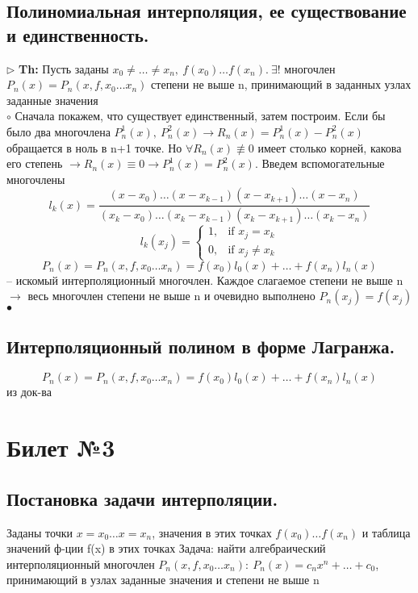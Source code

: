 \documentclass[a4paper]{article}
\begin{document}
\subsection{Полиномиальная интерполяция, ее существование и единственность.}
$\triangleright$ \textbf{Th:} Пусть заданы $x_0 \neq \ldots \neq x_n,\ f(x_0) \ldots f(x_n). \ \exists !$ многочлен $P_n(x) = P_n(x,f,x_0 \ldots x_n)$ степени не выше n, принимающий в заданных узлах заданные значения \\
	$\circ$ Сначала покажем, что существует единственный, затем построим.
	Если бы было два многочлена $P_n^1(x),\ P_n^2(x) \rightarrow R_n(x) = P_n^1(x)-P_n^2(x)$ обращается в ноль в n+1 точке. Но $\forall R_n(x) \not\equiv 0$ имеет столько корней, какова его степень $\rightarrow R_n(x) \equiv 0 \rightarrow P_n^1(x)=P_n^2(x)$.
	Введем вспомогательные многочлены $$l_k(x) = \frac{(x-x_0) \ldots (x-x_{k-1})(x-x_{k+1}) \ldots (x-x_n)}{(x_k-x_0) \ldots (x_k-x_{k-1})(x_k-x_{k+1}) \ldots (x_k-x_n)}$$ 
	$$l_k(x_j)=\begin{cases} 1,  & \mbox{if }x_j = x_k\\ 0, & \mbox{if }x_j \neq x_k \end{cases}$$
	$$P_n(x) = P_n(x,f,x_0 \ldots x_n) = f(x_0)l_0(x) + \ldots + f(x_n)l_n(x)$$ – искомый интерполяционный многочлен. Каждое слагаемое степени не выше n $\rightarrow$ весь многочлен степени не выше n и очевидно выполнено $P_n(x_j)=f(x_j)$
	$\bullet$
\subsection{Интерполяционный полином в форме Лагранжа.}
	$$P_n(x) = P_n(x,f,x_0 \ldots x_n) = f(x_0)l_0(x) + \ldots + f(x_n)l_n(x)$$ из док-ва

\section{Билет №3}
\subsection{Постановка задачи интерполяции.}
Заданы точки $x=x_0 \ldots x=x_n$, значения в этих точках $f(x_0) \ldots f(x_n)$ и таблица значений ф-ции f(x) в этих точках
Задача: найти алгебраический интерполяционный многочлен $P_n(x,f,x_0 \ldots x_n): \ P_n(x) = c_nx^n + \ldots +c_0$, принимающий в узлах заданные значения и степени не выше n
\end{document}
